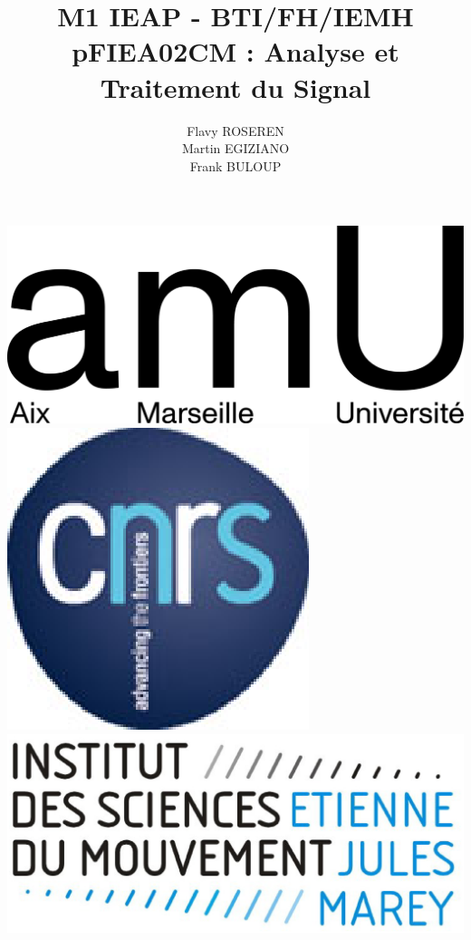 \documentclass[a4paper,11pt]{beamer}
\title{M1 IEAP - BTI/FH/IEMH\\pFIEA02CM : Analyse et Traitement du Signal}
\author{Flavy ROSEREN\\Martin EGIZIANO\\Frank BULOUP}
\institute{Aix Marseille Université\\Institut des Sciences du Mouvement}
\date{}
\begin{document}
 
 
\begin{frame}[plain] 
	\titlepage {}
	\vspace{1cm}
	\includegraphics[scale=0.6]{images/LogoAMU.png}\hspace*{2cm}
	\includegraphics[scale=0.2]{images/LogoCNRS.eps}\hspace*{2cm}
	\includegraphics[scale=0.1]{images/LogoISM.eps}
\end{frame} 
\end{document}
